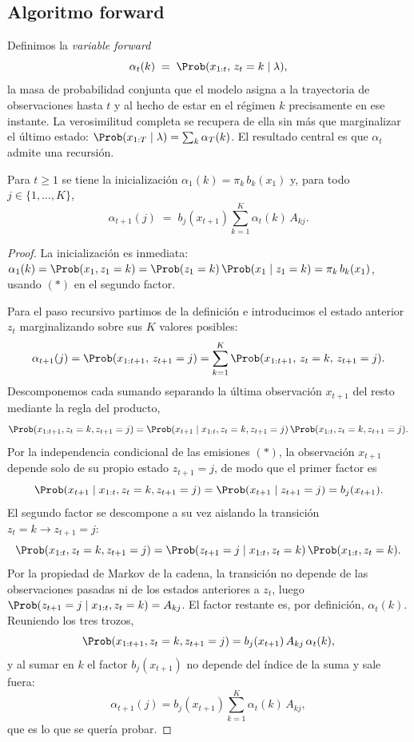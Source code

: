 \subsection{Algoritmo forward}
\label{sec:hmm-forward}

Definimos la \emph{variable forward}
\[
\alpha_t(k) \;=\; \Prob(x_{1:t},\, z_t = k \mid \lambda),
\]
la masa de probabilidad conjunta que el modelo asigna a la trayectoria de observaciones hasta $t$ y al hecho de estar en el régimen $k$ precisamente en ese instante. La verosimilitud completa se recupera de ella sin más que marginalizar el último estado: $\Prob(x_{1:T} \mid \lambda) = \sum_{k} \alpha_T(k)$. El resultado central es que $\alpha_t$ admite una recursión.

\begin{proposicion}
\label{prop:forward}
Para $t \ge 1$ se tiene la inicialización $\alpha_1(k) = \pi_k\, b_k(x_1)$ y, para todo $j \in \{1, \dots, K\}$,
\[
\alpha_{t+1}(j) \;=\; b_j(x_{t+1}) \sum_{k=1}^{K} \alpha_t(k)\, A_{kj}.
\]
\end{proposicion}

\begin{proof}
La inicialización es inmediata: $\alpha_1(k) = \Prob(x_1, z_1 = k) = \Prob(z_1 = k)\,\Prob(x_1 \mid z_1 = k) = \pi_k\, b_k(x_1)$, usando $(\ast)$ en el segundo factor.

Para el paso recursivo partimos de la definición e introducimos el estado anterior $z_t$ marginalizando sobre sus $K$ valores posibles:
\[
\alpha_{t+1}(j)
= \Prob(x_{1:t+1},\, z_{t+1} = j)
= \sum_{k=1}^{K} \Prob(x_{1:t+1},\, z_t = k,\, z_{t+1} = j).
\]
Descomponemos cada sumando separando la última observación $x_{t+1}$ del resto mediante la regla del producto,
\[
\Prob(x_{1:t+1}, z_t = k, z_{t+1} = j)
= \Prob(x_{t+1} \mid x_{1:t}, z_t = k, z_{t+1} = j)\,
  \Prob(x_{1:t}, z_t = k, z_{t+1} = j).
\]
Por la independencia condicional de las emisiones $(\ast)$, la observación $x_{t+1}$ depende solo de su propio estado $z_{t+1} = j$, de modo que el primer factor es
\[
\Prob(x_{t+1} \mid x_{1:t}, z_t = k, z_{t+1} = j) = \Prob(x_{t+1} \mid z_{t+1} = j) = b_j(x_{t+1}).
\]
El segundo factor se descompone a su vez aislando la transición $z_t = k \to z_{t+1} = j$:
\[
\Prob(x_{1:t}, z_t = k, z_{t+1} = j)
= \Prob(z_{t+1} = j \mid x_{1:t}, z_t = k)\, \Prob(x_{1:t}, z_t = k).
\]
Por la propiedad de Markov de la cadena, la transición no depende de las observaciones pasadas ni de los estados anteriores a $z_t$, luego $\Prob(z_{t+1} = j \mid x_{1:t}, z_t = k) = A_{kj}$. El factor restante es, por definición, $\alpha_t(k)$. Reuniendo los tres trozos,
\[
\Prob(x_{1:t+1}, z_t = k, z_{t+1} = j) = b_j(x_{t+1})\, A_{kj}\, \alpha_t(k),
\]
y al sumar en $k$ el factor $b_j(x_{t+1})$ no depende del índice de la suma y sale fuera:
\[
\alpha_{t+1}(j) = b_j(x_{t+1}) \sum_{k=1}^{K} \alpha_t(k)\, A_{kj},
\]
que es lo que se quería probar.
\end{proof}

